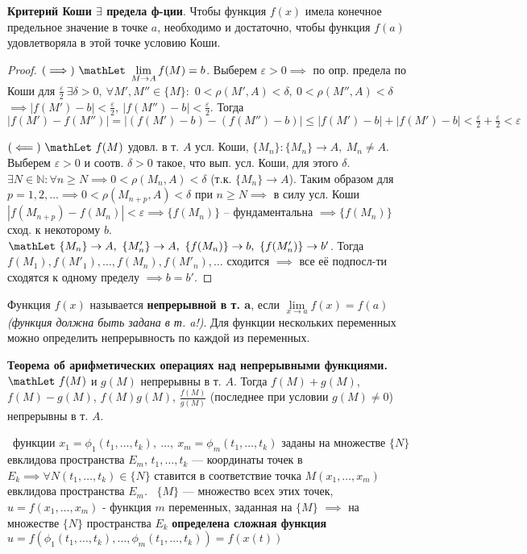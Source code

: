 \bigbreak
\textbf{Критерий Коши $\exists$ предела ф-ции}. Чтобы функция $f(x)$ имела конечное предельное значение в точке $a$, необходимо и достаточно, чтобы функция $f(a)$ удовлетворяла в этой точке условию Коши.

\begin{proof}
$(\implies) ~ \mathLet ~ \lim\limits_{M \to A}f(M)=b$. 
Выберем $\varepsilon > 0 \implies$ по опр. предела по Коши для $\frac{\varepsilon}{2} ~ \exists \delta > 0, ~ \forall M', M'' \in \{M\}:$
$0< \rho(M',A) < \delta, ~ 0< \rho(M'', A) < \delta$
$\implies \left|f(M')-b\right| < \frac{\varepsilon}{2}, ~ \left|f(M'')-b\right| < \frac{\varepsilon}{2}$. 
Тогда $ \left|f(M')-f(M'')\right| = \left|(f(M') - b) - (f(M'') - b)\right| \leq \left|f(M')-b\right| + \left|f(M')-b\right| <  \frac{\varepsilon}{2} + \frac{\varepsilon}{2} < \varepsilon$

$(\impliedby) ~ \mathLet ~ f(M)$ удовл. в т. $A$ усл. Коши, $\{M_n\}: \{M_n\} \rightarrow A, ~ M_n \neq A$. 
Выберем $\varepsilon > 0$ и соотв. $\delta > 0$ такое, что вып. усл. Коши, для этого $\delta$. 
$\exists N \in \mathbb{N} : \forall n \geq N \implies 0 < \rho(M_n,A) < \delta$ (т.к. $\{M_n\} \rightarrow A$).
Таким образом для $p = 1,2,\dots \implies 0 < \rho(M_{n+p},A) < \delta$ при $n \geq N \implies$ в силу усл. Коши $\left|f(M_{n+p})-f(M_n)\right| < \varepsilon \implies \{f(M_n)\}$ -- фундаментальна $\implies \{f(M_n)\}$ сход. к некоторому $b$. \\
$\mathLet ~ \{M_n\} \rightarrow A, ~ \{M'_n\} \rightarrow A, ~ \{f(M_n)\} \rightarrow b, ~ \{f(M'_n)\} \rightarrow b'$. Тогда $f(M_1), f(M'_1), \dots, f(M_n), f(M'_n), \dots$ сходится $\implies$ все её подпосл-ти сходятся к одному пределу $\implies b = b'$.
\end{proof}

\bigbreak
Функция $f(x)$ называется \textbf{непрерывной в т. a}, если $\lim\limits_{x \to a} f(x) = f(a)$ \textit{(функция должна быть задана в т. a!)}.
Для функции нескольких переменных можно определить непрерывность по каждой из переменных.

\bigbreak
\textbf{Теорема об арифметических операциях над непрерывными функциями.} $\mathLet ~ f(M)$ и $g(M)$ непрерывны в т. $A$. Тогда $f(M) + g(M)$, $f(M)-g(M)$, $f(M)g(M)$, $\frac{f(M)}{g(M)}$ (последнее при условии $g(M)\neq0$) непрерывны в т. $A$.

\bigbreak
\mathLet \ функции $x_1 = \phi_1(t_1,\dots,t_k), ~ \dots, ~ x_m = \phi_m(t_1,\dots,t_k)$ заданы на множестве $\{N\}$ евклидова пространства $E_m$, $t_1, \dots, t_k$ --- координаты точек в $E_k \implies \forall N(t_1,\dots,t_k) \in \{N\}$ ставится в соответствие точка $M(x_1,\dots,x_m)$ евклидова пространства $E_m$. \mathLet \ $\{M\}$ --- множество всех этих точек, $u = f(x_1,\dots,x_m)$ - функция $m$ переменных, заданная на $\{M\}$ $\implies$ на множестве $\{N\}$ пространства $E_k$ \textbf{определена сложная функция} $u = f(\phi_1(t_1,\dots,t_k),\dots,\phi_m(t_1,\dots,t_k)) = f(x(t))$

